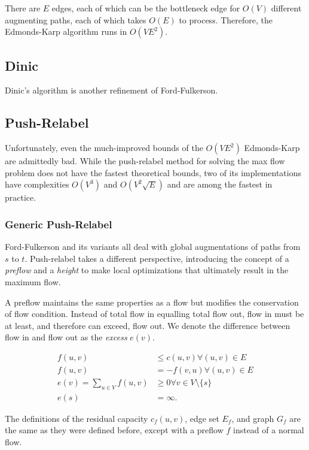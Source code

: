 There are $E$ edges, each of which can be the bottleneck edge for $O(V)$ different augmenting paths, each of which takes $O(E)$ to process. Therefore, the Edmonds-Karp algorithm runs in $O(VE^2)$.

\subsection{Dinic}

Dinic's algorithm is another refinement of Ford-Fulkerson.

\subsection{Push-Relabel}

Unfortunately, even the much-improved bounds of the $O(VE^2)$ Edmonds-Karp are admittedly bad. While the push-relabel method for solving the max flow problem does not have the fastest theoretical bounds, two of its implementations have complexities $O(V^3)$ and $O(V^2\sqrt{E})$ and are among the fastest in practice.

\subsubsection{Generic Push-Relabel}

Ford-Fulkerson and its variants all deal with global augmentations of paths from $s$ to $t$. Push-relabel takes a different perspective, introducing the concept of a \textit{preflow} and a \textit{height} to make local optimizations that ultimately result in the maximum flow.

A preflow maintains the same properties as a flow but modifies the conservation of flow condition. Instead of total flow in equalling total flow out, flow in must be at least, and therefore can exceed, flow out. We denote the difference between flow in and flow out as the \textit{excess} $e(v)$.

\begin{align*}
f(u,v) &\le c(u,v) \forall (u,v) \in E \\
f(u,v) &= -f(v,u) \forall (u,v) \in E \\
e(v) = \sum_{u \in V} f(u,v) &\ge 0 \forall v \in V \setminus \{s\} \\
e(s) &= \infty.
\end{align*}

The definitions of the residual capacity $c_f(u,v)$, edge set $E_f$, and graph $G_f$ are the same as they were defined before, except with a preflow $f$ instead of a normal flow.

